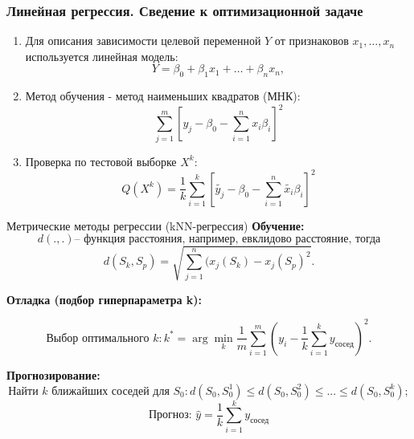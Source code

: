 \documentclass[10pt,pdf,unicode,aspectratio=169]{beamer}
\begin{document}
\begin{frame}
\frametitle{Линейная регрессия. Сведение к оптимизационной задаче}
\begin{enumerate}
    \item 
    Для описания зависимости целевой переменной $Y$ от признаковов $x_{1}, \ldots, x_{n}$ используется линейная модель:
    $$
    Y=\beta_{0}+\beta_{1} x_{1}+\ldots+\beta_{n} x_{n},
    $$
    \item Метод обучения - метод наименьших квадратов (МНК):
    $$
    \sum_{j=1}^{m}\left[y_{j}-\beta_{0}-\sum_{i=1}^{n} x_{i} \beta_{i}\right]^{2}
    $$
    \item Проверка по тестовой выборке $X^k$:
        $$
        Q(X^k) = \frac{1}{k}\sum_{i=1}^k \left[\widetilde{y_{j}}-\beta_{0}-\sum_{i=1}^{n} \widetilde{x_{i}} \beta_{i}\right]^{2} 
        $$
\end{enumerate}


\end{frame}


\begin{frame}{Метрические методы регрессии (kNN-регрессия)}
\textbf{Обучение:}
\[
        d(.,.) \text{-- функция расстояния, например, евклидово расстояние, тогда}
\]
\[
    d(S_k, S_p) = \sqrt{\sum_{j=1}^{n} (x_{j}(S_k) - x_{j}(S_p)^2}.
\]

\textbf{Отладка (подбор гиперпараметра k):}

\[
\text{Выбор оптимального } k: k^* = \arg\min_{k} \frac{1}{m} \sum_{i=1}^{m} \left( y_i - \frac{1}{k} \sum_{i=1}^{k} y_{\text{сосед}} \right)^2.
\]

\textbf{Прогнозирование:}
\[
\text{Найти } k \text{ ближайших соседей для } S_0:
d(S_0, S_0^1) \leqslant d(S_0, S_0^2) \leqslant ... \leqslant d(S_0, S_0^k);
\]
\[
\text{Прогноз: } \hat{y} = \frac{1}{k} \sum_{i=1}^{k} y_{\text{сосед}}
\]
\end{frame}
\end{document}
